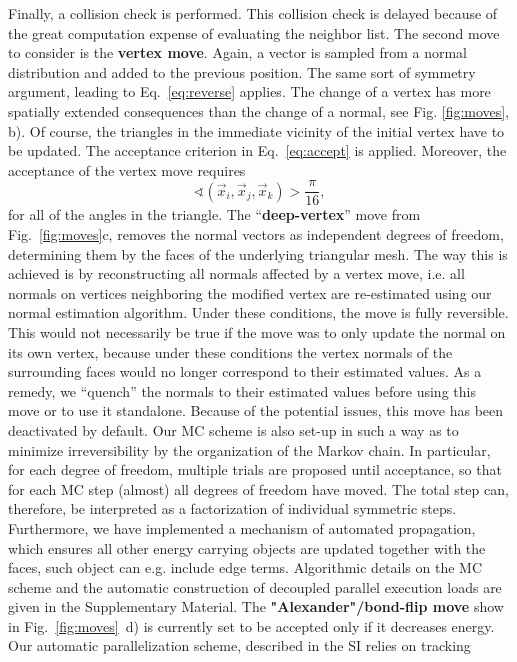 \documentclass[twocolumn]{biophys-new}
\begin{document}
Finally, a collision check is performed. This collision check is delayed because of the great computation expense of evaluating the neighbor list. 
The second move to consider is the \textbf{vertex move}. Again, a vector is sampled from a normal distribution and added to the previous position.
The same sort of symmetry argument, leading to Eq.~\eqref{eq:reverse} applies. The change of a vertex has more spatially extended consequences than the change of a normal, see Fig. \ref{fig:moves}, b). Of course, the triangles in the immediate vicinity of the initial vertex have to be updated. The acceptance criterion in Eq.~\eqref{eq:accept} is applied.
Moreover, the acceptance of the vertex move requires \begin{equation}
 \sphericalangle(\vec{x}_i,\vec{x}_j,\vec{x}_k) > \frac{\pi}{16},
\end{equation}
for all of the angles in the triangle. 
The ``\textbf{deep-vertex}'' move from Fig.~\ref{fig:moves}c, removes the normal vectors as independent degrees of freedom, determining them by the faces of the underlying triangular mesh. The way this is achieved is by reconstructing all normals affected by a vertex move, i.e. all normals on vertices neighboring the modified vertex are re-estimated using our normal estimation algorithm.
Under these conditions, the move is fully reversible. This would not necessarily be true if the move was to only update the normal on its own vertex, because under these conditions the vertex normals of the surrounding faces would no longer correspond to their estimated values. As a remedy, we ``quench'' the normals to their estimated values before using this move or to use it standalone. Because of the potential issues, this move has been deactivated by default. Our MC scheme is also set-up in such a way as to minimize irreversibility by the organization
of the Markov chain. In particular, for each degree of freedom, multiple trials\cite{4f63006b-689a-3636-a6e6-a36d119d0657} are  proposed until acceptance, so that for each MC step (almost) all degrees of freedom have moved. The total step can, therefore, be interpreted as a factorization of individual symmetric steps.\cite{10.3389/fphy.2021.663457} Furthermore, we have implemented a mechanism of automated propagation, which ensures all other energy carrying objects are updated together with the faces, such object can e.g. include edge terms. Algorithmic details on the MC scheme and the automatic construction of decoupled parallel execution loads are given in the Supplementary Material.
The \textbf{"Alexander"/bond-flip move} show in Fig.~\ref{fig:moves}~d) is currently set to be accepted only if it decreases energy. Our automatic parallelization  scheme, described in the SI relies on tracking
\end{document}
